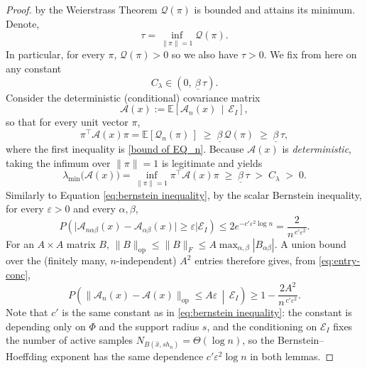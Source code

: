 \documentclass[10pt,a4paper]{amsart}
\begin{document}
\begin{proof}
by the Weierstrass Theorem $\mathcal{Q}(\pi)$ is bounded and attains its minimum.
Denote,
\begin{equation}
    \tau = \inf_{\|\pi\|=1} \mathcal{Q}(\pi).
    \label{pi*}
\end{equation}
In particular, for every $\pi$, $\mathcal{Q}(\pi)>0$ so we also have $\tau>0$. We fix from here on any constant
$$
C_\lambda \in \left(0,\ \underline{\beta}\,\tau\right).
$$
Consider the deterministic (conditional) covariance matrix
\begin{equation}
\mathscr{A}(x):=\mathbb{E}\!\left[\mathscr{A}_n(x)\,\middle|\,\mathscr{E}_I\right],
\end{equation}
so that for every unit vector $\pi$,
$$
\pi^\top\mathscr{A}(x)\pi=\mathbb{E}\!\left[\mathcal{Q}_n(\pi)\,\right]
\;\ge\;\underline{\beta}\,\mathcal{Q}(\pi)\;\ge\;\underline{\beta}\,\tau,
$$
where the first inequality is \eqref{bound of EQ_n}. Because $\mathscr{A}(x)$ is \emph{deterministic}, taking the infimum over $\|\pi\|=1$ is legitimate and yields
\begin{equation}
\lambda_{\min}\!\big(\mathscr{A}(x)\big)
=\inf_{\|\pi\|=1}\pi^\top\mathscr{A}(x)\pi
\;\ge\;\underline{\beta}\,\tau\;>\;C_\lambda\;>\;0 .
\label{eq:mean-pd}
\end{equation}
Similarly to Equation \eqref{eq:bernstein inequality}, by the scalar Bernstein inequality, for every $\varepsilon>0$ and every $\alpha,\beta$,
\begin{equation}
P\!\left(\big|\mathscr{A}_{n\alpha\beta}(x)-\mathscr{A}_{\alpha\beta}(x)\big|\ge\varepsilon
\Big|\mathscr{E}_I\right)\le 2e^{-c'\varepsilon^2\log n}=\frac{2}{n^{\,c'\varepsilon^2}}.
\label{eq:entry-conc}
\end{equation}
For an $A\times A$ matrix $B$, $\|B\|_{\mathrm{op}}\le\|B\|_F\le A\max_{\alpha,\beta}|B_{\alpha\beta}|$.
A union bound over the (finitely many, $n$-independent) $A^2$ entries therefore gives, from
\eqref{eq:entry-conc},
\begin{equation}
    P\!\left(\big\|\mathscr{A}_n(x)-\mathscr{A}(x)\big\|_{\mathrm{op}}\le A\varepsilon
\,\middle|\,\mathscr{E}_I\right)\ge 1-\frac{2A^2}{n^{\,c'\varepsilon^2}} .
\end{equation}
Note that $c'$ is the same constant as in \eqref{eq:bernstein inequality}: the constant is depending only on $\Phi$ and the support radius $s$, and the conditioning on $\mathscr{E}_I$ fixes the number of active samples $N_{B(\hat{x},sh_n)}=\Theta(\log n)$, so the Bernstein--Hoeffding exponent has the same dependence $c'\varepsilon^2\log n$ in both lemmas.


\end{proof}
\end{document}
